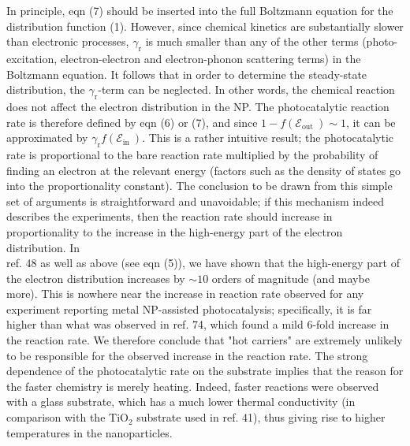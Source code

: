 \documentclass[10pt]{article}
\begin{document}
In principle, eqn (7) should be inserted into the full Boltzmann equation for the distribution function (1). However, since chemical kinetics are substantially slower than electronic processes, $\gamma_{\mathrm{r}}$ is much smaller than any of the other terms (photo-excitation, electron-electron and electron-phonon scattering terms) in the Boltzmann equation. It follows that in order to determine the steady-state distribution, the $\gamma_{\mathrm{r}}$-term can be neglected. In other words, the chemical reaction does not affect the electron distribution in the NP. The photocatalytic reaction rate is therefore defined by eqn (6) or (7), and since $1-f\left(\mathcal{E}_{\text {out }}\right) \sim 1$, it can be approximated by $\gamma_{\mathrm{r}} f\left(\mathcal{E}_{\text {in }}\right)$. This is a rather intuitive result; the photocatalytic rate is proportional to the bare reaction rate multiplied by the probability of finding an electron at the relevant energy (factors such as the density of states go into the proportionality constant). The conclusion to be drawn from this simple set of arguments is straightforward and unavoidable; if this mechanism indeed describes the experiments, then the reaction rate should increase in proportionality to the increase in the high-energy part of the electron distribution. In\\
ref. 48 as well as above (see eqn (5)), we have shown that the high-energy part of the electron distribution increases by $\sim 10$ orders of magnitude (and maybe more). This is nowhere near the increase in reaction rate observed for any experiment reporting metal NP-assisted photocatalysis; specifically, it is far higher than what was observed in ref. 74, which found a mild 6-fold increase in the reaction rate. We therefore conclude that "hot carriers" are extremely unlikely to be responsible for the observed increase in the reaction rate. The strong dependence of the photocatalytic rate on the substrate implies that the reason for the faster chemistry is merely heating. Indeed, faster reactions were observed with a glass substrate, which has a much lower thermal conductivity (in comparison with the $\mathrm{TiO}_{2}$ substrate used in ref. 41), thus giving rise to higher temperatures in the nanoparticles.
\end{document}
